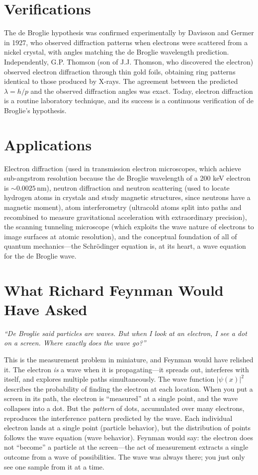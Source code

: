 \documentclass[11pt,openright]{book}
\begin{document}
\section*{Verifications}

The de Broglie hypothesis was confirmed experimentally by Davisson and Germer in 1927, who observed diffraction patterns when electrons were scattered from a nickel crystal, with angles matching the de Broglie wavelength prediction. Independently, G.P. Thomson (son of J.J. Thomson, who discovered the electron) observed electron diffraction through thin gold foils, obtaining ring patterns identical to those produced by X-rays. The agreement between the predicted $\lambda = h/p$ and the observed diffraction angles was exact. Today, electron diffraction is a routine laboratory technique, and its success is a continuous verification of de Broglie's hypothesis.
\section*{Applications}

Electron diffraction (used in transmission electron microscopes, which achieve sub-angstrom resolution because the de Broglie wavelength of a 200 keV electron is $\sim 0.0025\,\text{nm}$), neutron diffraction and neutron scattering (used to locate hydrogen atoms in crystals and study magnetic structures, since neutrons have a magnetic moment), atom interferometry (ultracold atoms split into paths and recombined to measure gravitational acceleration with extraordinary precision), the scanning tunneling microscope (which exploits the wave nature of electrons to image surfaces at atomic resolution), and the conceptual foundation of all of quantum mechanics---the Schrödinger equation is, at its heart, a wave equation for the de Broglie wave.
\section*{What Richard Feynman Would Have Asked}

\textit{``De Broglie said particles are waves. But when I look at an electron, I see a dot on a screen. Where exactly does the wave go?''}

This is the measurement problem in miniature, and Feynman would have relished it. The electron \emph{is} a wave when it is propagating---it spreads out, interferes with itself, and explores multiple paths simultaneously. The wave function $|\psi(x)|^2$ describes the probability of finding the electron at each location. When you put a screen in its path, the electron is ``measured'' at a single point, and the wave collapses into a dot. But the \emph{pattern} of dots, accumulated over many electrons, reproduces the interference pattern predicted by the wave. Each individual electron lands at a single point (particle behavior), but the distribution of points follows the wave equation (wave behavior). Feynman would say: the electron does not ``become'' a particle at the screen---the act of measurement extracts a single outcome from a wave of possibilities. The wave was always there; you just only see one sample from it at a time.
\end{document}
